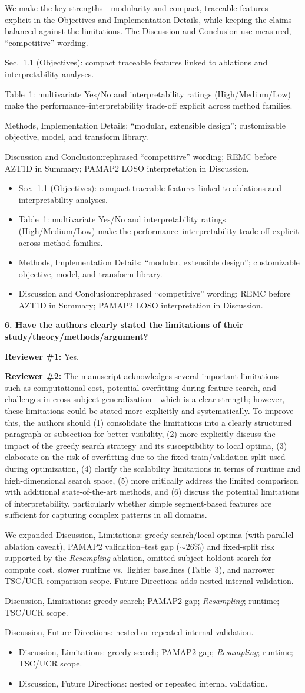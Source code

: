 \documentclass[11pt]{article}
\makeatletter
\newcommand{\rsp}{\par\vspace{0.9em}}
\newcommand{\rcbothq}[3]{%
  \begin{reviewerbox}\textbf{#1}\par\smallskip\textbf{Reviewer \#1:} #2\par\smallskip%
  \textbf{Reviewer \#2:} #3\end{reviewerbox}}
\newcommand{\response}[2]{%
  \begin{responsebox}#1%
  \def\@responseitems{#2}%
  \ifx\@responseitems\empty\else\begin{itemize}[nosep,leftmargin=1.2em]#2\end{itemize}\fi
  \end{responsebox}\rsp}
\makeatother
\begin{document}
\response{We make the key strengths---modularity and compact, traceable features---explicit in the
Objectives and Implementation Details, while keeping the claims balanced against the limitations.
The Discussion and Conclusion use measured, ``competitive'' wording.}{
  \item Sec.~1.1 (Objectives): compact traceable features linked to ablations and interpretability
    analyses.
  \item Table~1: multivariate Yes/No and interpretability ratings (High/Medium/Low) make the
    performance--interpretability trade-off explicit across method families.
  \item Methods, Implementation Details: ``modular, extensible design''; customizable objective,
    model, and transform library.
  \item Discussion and Conclusion:rephrased ``competitive'' wording; REMC before AZT1D in Summary;
    PAMAP2 LOSO interpretation in Discussion.
}

\rcbothq{6. Have the authors clearly stated the limitations of their
study/theory/methods/argument?}{Yes.}
{The manuscript acknowledges several important limitations---such as computational cost, potential
overfitting during feature search, and challenges in cross-subject generalization---which is a
clear strength; however, these limitations could be stated more explicitly and systematically.
To improve this, the authors should (1) consolidate the limitations into a clearly structured
paragraph or subsection for better visibility, (2) more explicitly discuss the impact of the
greedy search strategy and its susceptibility to local optima, (3) elaborate on the risk of
overfitting due to the fixed train/validation split used during optimization, (4) clarify the
scalability limitations in terms of runtime and high-dimensional search space, (5) more
critically address the limited comparison with additional state-of-the-art methods, and (6)
discuss the potential limitations of interpretability, particularly whether simple segment-based
features are sufficient for capturing complex patterns in all domains.}

\response{We expanded Discussion, Limitations: greedy search/local optima (with parallel ablation
caveat), PAMAP2 validation--test gap (${\sim}26\%$) and fixed-split risk supported by the
\emph{Resampling} ablation, omitted subject-holdout search for compute cost, slower runtime vs.\
lighter baselines (Table~3), and narrower TSC/UCR comparison scope. Future Directions adds nested
internal validation.}{
  \item Discussion, Limitations: greedy search; PAMAP2 gap; \emph{Resampling}; runtime; TSC/UCR scope.
  \item Discussion, Future Directions: nested or repeated internal validation.
}
\end{document}
